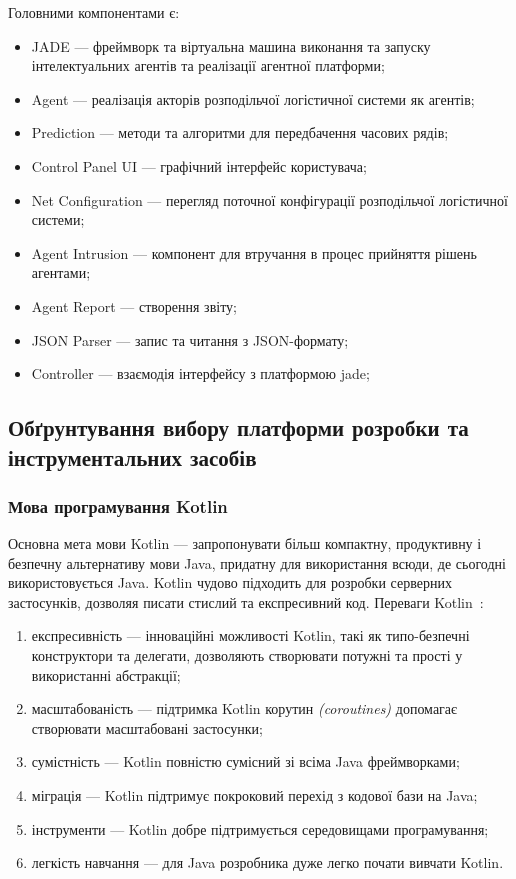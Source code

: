 Головними компонентами є:
\begin{itemize}
	\item JADE --- фреймворк та віртуальна машина виконання та запуску інтелектуальних агентів та реалізації агентної платформи;
	\item Agent --- реалізація акторів розподільчої логістичної системи як агентів;
	\item Prediction --- методи та алгоритми для передбачення часових рядів;
	\item Control Panel UI --- графічний інтерфейс користувача;
	\item Net Configuration --- перегляд поточної конфігурації розподільчої логістичної системи;
	\item Agent Intrusion --- компонент для втручання в процес прийняття рішень агентами;
	\item Agent Report --- створення звіту;
	\item JSON Parser --- запис та читання з JSON-формату;
	\item Controller --- взаємодія інтерфейсу з платформою \acrshort{jade};
\end{itemize}

\subsection{Обґрунтування вибору платформи розробки та інструментальних засобів}
\subsubsection{Мова програмування Kotlin}
Основна мета мови Kotlin --- запропонувати більш компактну, продуктивну і безпечну альтернативу мови Java, придатну для використання всюди, де сьогодні використовується Java.
Kotlin чудово підходить для розробки серверних застосунків, дозволяя писати стислий та експресивний код.
Переваги Kotlin~\cite{kotlin,Panchal2017}:  
\begin{enumerate}[label={\arabic*)}]
	\item експресивність --- інноваційні можливості Kotlin, такі як типо-безпечні конструктори та делегати, дозволяють створювати потужні та прості у використанні абстракції;
	\item масштабованість --- підтримка Kotlin корутин \textit{(coroutines)} допомагає створювати масштабовані застосунки;
	\item сумістність --- Kotlin повністю сумісний зі всіма Java фреймворками;
	\item міграція --- Kotlin підтримує покроковий перехід з кодової бази на Java;
	\item інструменти --- Kotlin добре підтримується середовищами програмування;
	\item легкість навчання --- для Java розробника дуже легко почати вивчати Kotlin.
\end{enumerate}

